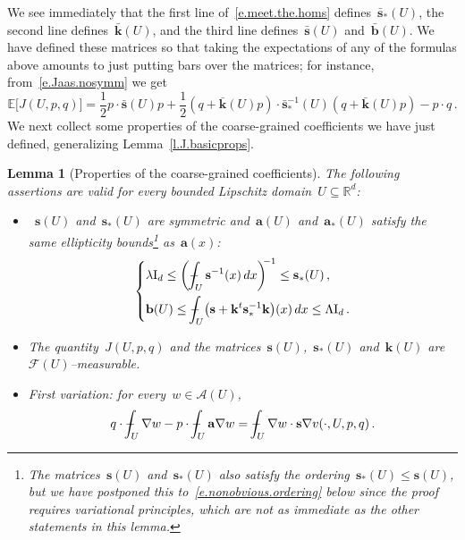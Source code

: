\documentclass[11pt,twoside]{article} %
\numberwithin{equation}{section}
\newtheorem{lemma}[theorem]{Lemma}
\theoremstyle{definition}
\let\originalleft\left
\let\originalright\right
\renewcommand{\left}{\mathopen{}\mathclose\bgroup\originalleft}
\renewcommand{\right}{\aftergroup\egroup\originalright}
\newcommand*{\Id}{\ensuremath{\mathrm{I}_d}}
\newcommand*{\Rd}{\ensuremath{\mathbb{R}^d}}
\renewcommand{\b}{\ensuremath{\mathbf{b}}}
\newcommand{\s}{\mathbf{s}}
\renewcommand{\a}{\mathbf{a}}
\renewcommand{\k}{\mathbf{k}}
\newcommand{\bhom}{\bar{\mathbf{b}}}
\newcommand{\shom}{\bar{\mathbf{s}}}
\newcommand{\khom}{\bar{\mathbf{k}}}
\newcommand{\F}{\mathcal{F}}
\newcommand{\E}{\mathbb{E}}
\def\Xint#1{\mathchoice
{\XXint\displaystyle\textstyle{#1}}%
{\XXint\textstyle\scriptstyle{#1}}%
{\XXint\scriptstyle\scriptscriptstyle{#1}}%
{\XXint\scriptscriptstyle\scriptscriptstyle{#1}}%
\!\int}
\def\XXint#1#2#3{{\setbox0=\hbox{$#1{#2#3}{\int}$}
\vcenter{\hbox{$#2#3$}}\kern-.5\wd0}}
\def\fint{\Xint-}
\newcommand{\A}{\mathcal{A}}
\begin{document}
We see immediately that the first line of~\eqref{e.meet.the.homs} defines~$\shom_*(U)$, the second line defines~$\khom(U)$, and the third line defines~$\shom(U)$ and~$\bhom(U)$. 
We have defined these matrices so that taking the expectations of any of the formulas above amounts to just putting bars over the matrices; for instance, from~\eqref{e.Jaas.nosymm} we get
\begin{equation}
\label{e.Jaas.nosymm.E}
\E \bigl[ J(U,p,q) \bigr] =
\frac 12p \cdot \shom(U)p 
+ \frac 12 (q+\khom(U) p) \cdot \shom_*^{-1}(U) (q+\khom(U) p) 
- p \cdot q \,.
\end{equation}
We next collect some properties of the coarse-grained coefficients we have just defined, generalizing Lemma~\ref{l.J.basicprops}.


\begin{lemma}[Properties of the coarse-grained coefficients]
\label{l.J.basicprops.nosymm}
The following assertions are valid for every bounded Lipschitz domain~$U \subseteq\Rd$:

\begin{itemize} 
\item~$\s(U)$ and~$\s_*(U)$ are symmetric and~$\a(U)$ and~$\a_*(U)$ satisfy the same ellipticity bounds\footnote{The matrices~$\s(U)$ and~$\s_*(U)$ also satisfy the ordering~$\s_*(U)\leq \s(U)$, but we have postponed this to~\eqref{e.nonobvious.ordering} below since the proof requires variational principles, which are not as immediate as the other statements in this lemma.} as~$\a(x)$:
\begin{equation}
\label{e.a.bounds.nosymm}
\left\{
\begin{aligned}
& \lambda  \Id 
\leq
\biggl( \fint_{U} \s^{-1} (x)\,dx \biggr)^{\!\!-1} 
\leq 
\s_*(U) 
\,, \\
&
\b(U)
\leq 
\fint_U \bigl ( \s + \k^t \s_*^{-1} \k \bigr )(x)\, dx
\leq \Lambda \Id \,.
\end{aligned}
\right.
\end{equation}

\item The quantity~$J(U,p,q)$ and the matrices~$\s(U)$,~$\s_*(U)$ and~$\k(U)$ are~$\F(U)$--measurable. 

\item First variation: for every~$w\in \A(U)$,
\begin{equation}
\label{e.firstvar.nosymm}
q\cdot \fint_U \nabla w - p \cdot \fint_U \a \nabla w 
=
\fint_U \nabla w \cdot \s \nabla v(\cdot,U,p,q)\, . 
\end{equation}



\end{itemize}
\end{lemma}
\end{document}
